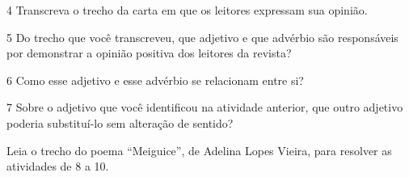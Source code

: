 \num{4} Transcreva o trecho da carta em que os leitores expressam sua opinião.


\num{5} Do trecho que você transcreveu, 
que adjetivo e que advérbio são responsáveis 
por demonstrar a opinião positiva dos leitores da revista?


\num{6} Como esse adjetivo e esse advérbio se relacionam entre si?


\num{7} Sobre o adjetivo que você identificou na atividade anterior, que outro adjetivo poderia substituí-lo sem alteração de sentido?


Leia o trecho do poema ``Meiguice'', de Adelina Lopes Vieira, para resolver as atividades de 8 a 10.

